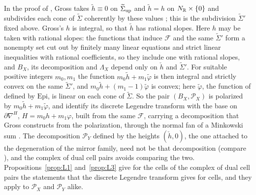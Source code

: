 \begin{remark}\label{rem:DLT}
In the proof of \cite[Thm.~3.26]{Gross2005}, Gross takes $\tilde h\equiv0$ on $\widetilde\Sigma_{\rm up}$ and $\tilde h=h$
on $N_\mathbb R\times\{0\}$ and subdivides each cone of $\widetilde\Sigma$ coherently by these values \cite[Rem.~3.18]{Gross2005};
this is the subdivision $\widetilde\Sigma'$ fixed above. Gross's $h$ is integral, so that $\tilde h$ has rational slopes.
Here $h$ may be taken with rational slopes: the functions that induce $\mathcal F$ and the same $\widetilde\Sigma'$ form a nonempty set cut
out by finitely many linear equations and strict linear inequalities with rational coefficients, so they include one with rational
slopes, and $B_X$, its decomposition and $\Lambda_X$ depend only on $\check h$ and $\widetilde\Sigma'$. For suitable positive
integers $m_0,m_1$ the function $m_0\tilde h+m_1\tilde\varphi$ is then integral and strictly convex on the same
$\widetilde\Sigma'$, and $m_0\tilde h+(m_1-1)\tilde\varphi$ is convex; here $\tilde\varphi$, the function of
\cite[\S3]{Gross2005} defined by $\mathrm{Epi}$, is linear on each cone of $\widetilde\Sigma$. So the pair
$(B_X,\mathscr P_X)$ is polarized by $m_0\tilde h+m_1\tilde\varphi$, and \cite[Thms.~3.21, 3.25]{Gross2005} identify its
discrete Legendre transform with the base on $\partial\nabla^H$, $H=m_0h+m_1\varphi$, built from the same $\mathcal F$, carrying
a decomposition that Gross constructs from the polarization, through the normal fan of a Minkowski sum
\cite[\S3, the construction before Lemma~3.19, and Thm.~3.21]{Gross2005}. The decomposition $\mathscr P_Y$ defined by the heights $(\check h,0)$, the one attached to the
degeneration of the mirror family, need not be that decomposition (compare \cite[\S3, after Rem.~3.18]{Gross2005}), and the
complex of dual cell pairs avoids comparing the two.
Propositions~\ref{prop:L1} and~\ref{prop:L3} give for the cells of the complex of dual cell pairs the statements that the discrete
Legendre transform gives for cells, and they apply to $\mathscr P_X$ and $\mathscr P_Y$ alike.
\end{remark}


